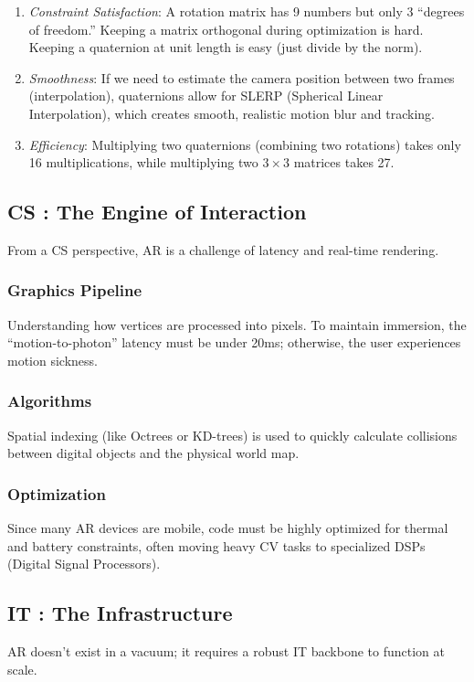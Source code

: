 \documentclass[11pt]{article}
\begin{document}
\begin{enumerate}
\item \emph{Constraint Satisfaction}: A rotation matrix has 9
numbers but only 3 ``degrees of freedom.''  Keeping a
matrix orthogonal during optimization is hard.
Keeping a quaternion at unit length is easy (just
divide by the norm).
\item \emph{Smoothness}: If we need to estimate the camera
position between two frames (interpolation),
quaternions allow for SLERP (Spherical Linear
Interpolation), which creates smooth, realistic
motion blur and tracking.
\item \emph{Efficiency}: Multiplying two quaternions (combining
two rotations) takes only 16 multiplications, while
multiplying two \(3 \times 3\) matrices takes 27.
\end{enumerate}
\subsection{CS : The Engine of Interaction}
\label{sec:org02c3eea}
From a CS perspective, AR is a challenge of latency and
real-time rendering.
\subsubsection{Graphics Pipeline}
\label{sec:orgdeb6d56}
Understanding how vertices are processed into
pixels. To maintain immersion, the ``motion-to-photon''
latency must be under 20ms; otherwise, the user
experiences motion sickness.
\subsubsection{Algorithms}
\label{sec:org843b240}

Spatial indexing (like Octrees or KD-trees) is used to
quickly calculate collisions between digital objects
and the physical world map.
\subsubsection{Optimization}
\label{sec:org9e52716}

Since many AR devices are mobile, code must be highly
optimized for thermal and battery constraints, often
moving heavy CV tasks to specialized DSPs (Digital
Signal Processors).
\subsection{IT : The Infrastructure}
\label{sec:org00ee334}
AR doesn't exist in a vacuum; it requires a robust IT
backbone to function at scale.
\end{document}
